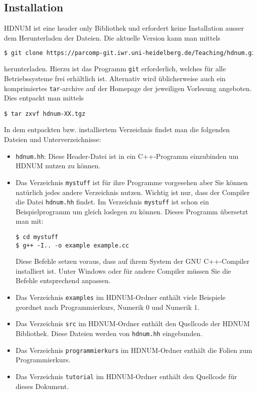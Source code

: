 \documentclass[a4paper,11pt]{article}
\theoremstyle{definition}
\begin{document}
\subsection{Installation}

HDNUM ist eine \glqq{}header only\grqq{} Bibliothek und erfordert keine Installation
ausser dem Herunterladen der Dateien. Die aktuelle Version kann man mittels
\begin{lstlisting}[basicstyle=\ttfamily\footnotesize,language=bash,frame=single]
$ git clone https://parcomp-git.iwr.uni-heidelberg.de/Teaching/hdnum.git
\end{lstlisting}
herunterladen. Hierzu ist das Programm \lstinline{git} erforderlich, welches für alle
Betriebssysteme frei erhältlich ist. Alternativ wird üblicherweise auch ein 
komprimiertes \lstinline{tar}-archive auf der Homepage der jeweiligen Vorlesung angeboten.
Dies entpackt man mittels
\begin{lstlisting}[basicstyle=\ttfamily\small,frame=single]
$ tar zxvf hdnum-XX.tgz
\end{lstlisting}
In dem entpackten bzw. installiertem Verzeichnis findet man die folgenden Dateien und
Unterverzeichnisse:
\begin{itemize}
\item \lstinline{hdnum.hh}: Diese Header-Datei ist in ein C++-Programm einzubinden um HDNUM
nutzen zu können. 
\item Das Verzeichnis \lstinline{mystuff} ist für ihre Programme vorgesehen aber Sie können
natürlich jedes andere Verzeichnis nutzen. Wichtig ist nur, dass der Compiler die Datei 
\lstinline{hdnum.hh} findet. Im Verzeichnis \lstinline{mystuff} ist schon ein Beispielprogramm
um gleich loslegen zu können. Dieses Programm übersetzt man mit:
\begin{lstlisting}[basicstyle=\ttfamily\small,frame=single]
$ cd mystuff
$ g++ -I.. -o example example.cc
\end{lstlisting}
Diese Befehle setzen voraus, dass auf ihrem System der GNU C++-Compiler installiert ist.
Unter Windows oder für andere Compiler müssen Sie die Befehle entsprechend anpassen.
\item Das Verzeichnis \lstinline{examples} im HDNUM-Ordner enthält viele Beispiele
geordnet nach Programmierkurs, Numerik 0 und Numerik 1.
\item Das Verzeichnis \lstinline{src} im HDNUM-Ordner enthält den Quellcode
der HDNUM Bibliothek. Diese Dateien werden von \lstinline{hdnum.hh} eingebunden.
\item Das Verzeichnis \lstinline{programmierkurs} im HDNUM-Ordner enthält
die Folien zum Programmierkurs.
\item Das Verzeichnis \lstinline{tutorial} im HDNUM-Ordner enthält den Quellcode
für dieses Dokument.
\end{itemize}
\end{document}
